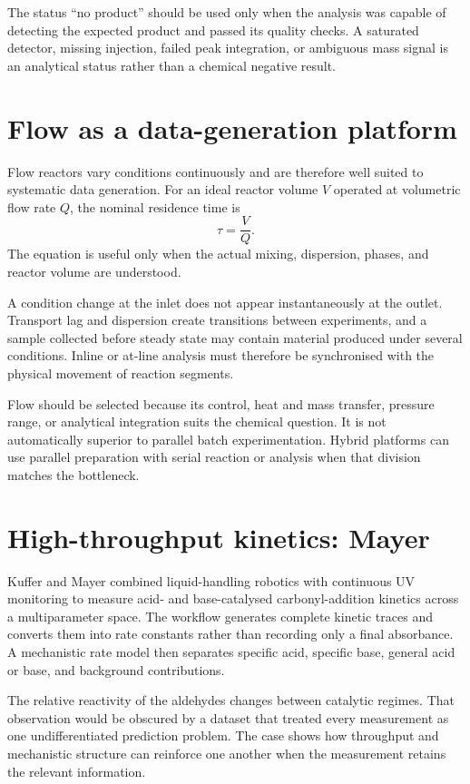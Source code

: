The status ``no product'' should be used only when the analysis was capable of detecting the expected product and passed its quality checks.
A saturated detector, missing injection, failed peak integration, or ambiguous mass signal is an analytical status rather than a chemical negative result.

\section{Flow as a data-generation platform}

Flow reactors vary conditions continuously and are therefore well suited to systematic data generation.
For an ideal reactor volume $V$ operated at volumetric flow rate $Q$, the nominal residence time is
\begin{equation}
  \tau=\frac{V}{Q}.
\end{equation}
The equation is useful only when the actual mixing, dispersion, phases, and reactor volume are understood.

A condition change at the inlet does not appear instantaneously at the outlet.
Transport lag and dispersion create transitions between experiments, and a sample collected before steady state may contain material produced under several conditions.
Inline or at-line analysis must therefore be synchronised with the physical movement of reaction segments.

Flow should be selected because its control, heat and mass transfer, pressure range, or analytical integration suits the chemical question.
It is not automatically superior to parallel batch experimentation.
Hybrid platforms can use parallel preparation with serial reaction or analysis when that division matches the bottleneck.

\section{High-throughput kinetics: Mayer}

Kuffer and Mayer combined liquid-handling robotics with continuous UV monitoring to measure acid- and base-catalysed carbonyl-addition kinetics across a multiparameter space.
The workflow generates complete kinetic traces and converts them into rate constants rather than recording only a final absorbance.
A mechanistic rate model then separates specific acid, specific base, general acid or base, and background contributions.

The relative reactivity of the aldehydes changes between catalytic regimes.
That observation would be obscured by a dataset that treated every measurement as one undifferentiated prediction problem.
The case shows how throughput and mechanistic structure can reinforce one another when the measurement retains the relevant information.

